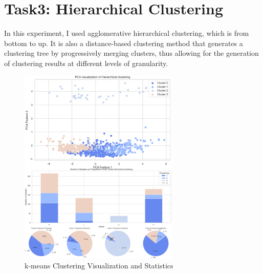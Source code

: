 \documentclass[journal]{IEEEtai}
\begin{document}
\section{\textbf{Task3: Hierarchical Clustering}}
In this experiment, I used agglomerative hierarchical clustering, which is from bottom to up. It is also a distance-based clustering method that generates a clustering tree by progressively merging clusters, thus allowing for the generation of clustering results at different levels of granularity.

\begin{figure}[htbp]
	\centerline{\includegraphics[width=18pc]{Hiera-sum.png}}
	\caption{k-means Clustering Visualization and Statistics}
\end{figure}
\end{document}
